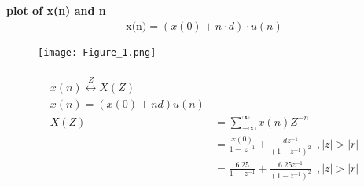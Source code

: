 \documentclass[journal,12pt,twocolumn]{IEEEtran}
\theoremstyle{remark}
\begin{document}
\textbf{plot of x(n) and n}
\begin{align}
    \text{{x(n)}}=(x(0)+n \cdot d ) \cdot u(n)
\end{align}
\begin{figure}[h]
    \renewcommand\thefigure{1}
    \centering
    \captionsetup{justification=centering}
    \texttt{[image: Figure\_1.png]}
    \caption{}
    \label{stemplot2}
\end{figure}\begin{align}
\\x(n)\overset{Z}{\longleftrightarrow}  X(Z)
\\x(n)=(x(0)+nd)u(n)
\\X(Z)&=\sum_{-\infty}^{\infty}x(n)Z^{-n}\
\\&=\frac{x(0)}{1-\,z^{-1}}+\frac{dz^{-1}}{({1-{z^{-1}}})^2}\:\:,|z|>|r|
\\&=\frac{6.25}{1-\,z^{-1}}+\frac{6.25z^{-1}}{({1-{z^{-1}}})^2}\:\:,|z|>|r|
\end{align}
 
\end{document}
